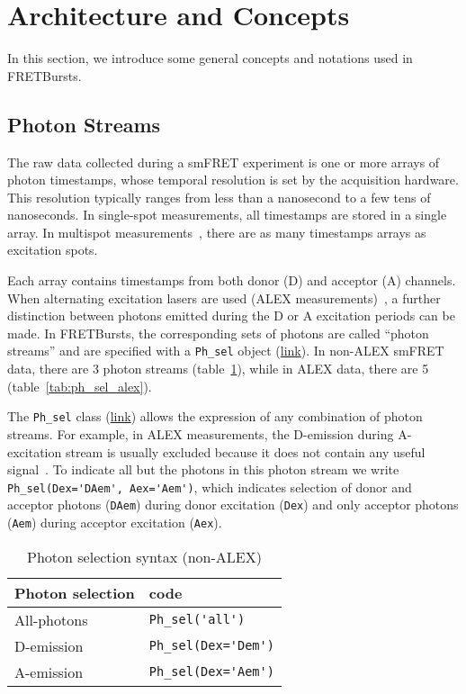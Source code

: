 \section{Architecture and Concepts}
\label{sec:concepts}

In this section, we introduce some general concepts and notations used in FRETBursts.

\subsection{Photon Streams}
\label{sec:ph_streams}

The raw data collected during a smFRET experiment is one or more arrays of photon timestamps, whose temporal resolution is set by the acquisition hardware. This resolution typically ranges from less than a nanosecond to a few tens of nanoseconds.
In single-spot
measurements, all timestamps are stored in a single array. In multispot
measurements~\cite{Ingargiola_2013}, there are as many timestamps arrays
as excitation spots.

Each array contains timestamps from both donor (D) and acceptor (A) channels.
When alternating excitation lasers are used (ALEX measurements)~\cite{Lee_2005}, a further distinction between
photons emitted during the D or A excitation periods can be made. In FRETBursts, the corresponding
sets of photons are called ``photon streams'' and are
specified with a \verb|Ph_sel| object
(\href{http://fretbursts.readthedocs.org/en/latest/ph_sel.html}{link}).
In non-ALEX smFRET data, there are 3 photon streams
(table~\ref{tab:ph_sel_smfret}), while in ALEX data, there are 5 (table~\ref{tab:ph_sel_alex}).

The \verb|Ph_sel| class (\href{http://fretbursts.readthedocs.org/en/latest/ph_sel.html}{link})
allows the expression of any combination of photon streams.
For example, in ALEX measurements, the D-emission during A-excitation stream is
usually excluded because it does not contain any useful signal~\cite{Lee_2005}.
To indicate all but the photons in this photon stream we write
\verb|Ph_sel(Dex='DAem', Aex='Aem')|, which indicates selection of donor
and acceptor photons (\verb|DAem|) during donor excitation (\verb|Dex|) and only acceptor
photons (\verb|Aem|) during acceptor excitation (\verb|Aex|).

\begin{table}
\begin{tabular}{l|l}
  Photon selection  & code \\
  \hline
  All-photons       & \verb|Ph_sel('all')|\\
  D-emission    & \verb|Ph_sel(Dex='Dem')|\\
  A-emission & \verb|Ph_sel(Dex='Aem')|\\
\end{tabular}
\caption{\label{tab:ph_sel_smfret}Photon selection syntax (non-ALEX)}
\end{table}

